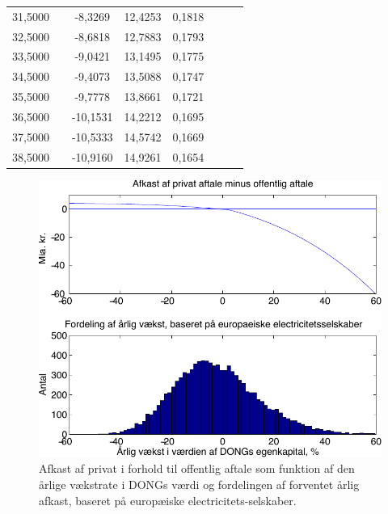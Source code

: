 \documentclass{article}
\begin{document}
\begin{table}[h]
\begin{center}
\begin{tabular}{cXcccccr}
31{,}5000&&-8{,}3269&12{,}4253& 0{,}1818\\
32{,}5000&&-8{,}6818&12{,}7883& 0{,}1793\\
33{,}5000&&-9{,}0421&13{,}1495& 0{,}1775\\
34{,}5000&&-9{,}4073&13{,}5088& 0{,}1747\\
35{,}5000&&-9{,}7778&13{,}8661& 0{,}1721\\
36{,}5000&&-10{,}1531&14{,}2212& 0{,}1695\\
37{,}5000&&-10{,}5333&14{,}5742& 0{,}1669\\
38{,}5000&&-10{,}9160&14{,}9261& 0{,}1654\\
		\bottomrule[1pt]
	\end{tabular}
\end{center}
\end{table}


\begin{figure}
\centerline{\includegraphics[scale=0.8]{../matlab/figs/afkast_hist_combine_elec_guan}}
\caption{Afkast af privat i forhold til offentlig aftale som funktion af den årlige v\ae{}kstrate i DONGs v\ae{}rdi og fordelingen af forventet \aa{}rlig afkast, baseret p\aa{} europ\ae{}iske electricitets-selskaber.}
\label{fig:combine1}
\end{figure}
\end{document}
